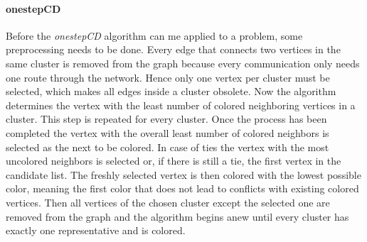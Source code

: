 \documentclass[paper = a4, fontsize = 10pt]{scrartcl}
\begin{document}

\paragraph{onestepCD}{
\label{sec:construct}
Before the \emph{onestepCD} algorithm can me applied to a problem, some preprocessing needs to be done. Every edge that connects two vertices in the same cluster is removed from the graph because every communication only needs one route through the network. Hence only one vertex per cluster must be selected, which makes all edges inside a cluster obsolete. Now the algorithm determines the vertex with the least number of colored neighboring vertices in a cluster. This step is repeated for every cluster. Once the process has been completed the vertex with the overall least number of colored neighbors is selected as the next to be colored. In case of ties the vertex with the most uncolored neighbors is selected or, if there is still a tie, the first vertex in the candidate list. The freshly selected vertex is then colored with the lowest possible color, meaning the first color that does not lead to conflicts with existing colored vertices. Then all vertices of the chosen cluster except the selected one are removed from the graph and the algorithm begins anew until every cluster has exactly one representative and is colored.

}
\end{document}
